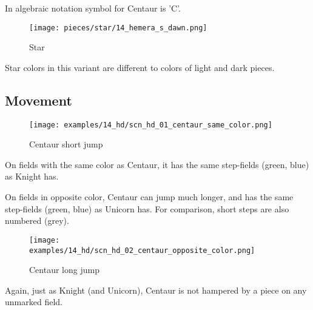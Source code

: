 In algebraic notation symbol for Centaur is ’C’.

\noindent
\begin{wrapfigure}{l}{0.4\textwidth}
\centering
\texttt{[image: pieces/star/14\_hemera\_s\_dawn.png]}
\caption{Star}
\label{fig:star/14_hemera_s_dawn}
\end{wrapfigure}
Star colors in this variant are different to colors of light and dark pieces.

\clearpage %

\subsection*{Movement}

\vspace*{-0.7\baselineskip}
\noindent
\begin{wrapfigure}[9]{l}{0.4\textwidth}
\centering
\texttt{[image: examples/14\_hd/scn\_hd\_01\_centaur\_same\_color.png]}
\vspace*{-0.7\baselineskip}
\caption{Centaur short jump}
\label{fig:scn_hd_01_centaur_same_color}
\end{wrapfigure}
On fields with the same color as Centaur, it has the same step-fields (green, blue)
as Knight has.

On fields in opposite color, Centaur can jump much longer, and has the same step-fields
(green, blue) as Unicorn has. For comparison, short steps are also numbered (grey).

\vspace*{0.3\baselineskip}
\noindent
\begin{wrapfigure}[13]{l}{0.6\textwidth}
\centering
\texttt{[image: examples/14\_hd/scn\_hd\_02\_centaur\_opposite\_color.png]}
\vspace*{-0.7\baselineskip}
\caption{Centaur long jump}
\label{fig:scn_hd_02_centaur_opposite_color}
\end{wrapfigure}
Again, just as Knight (and Unicorn), Centaur is not hampered by a piece on any unmarked field.

